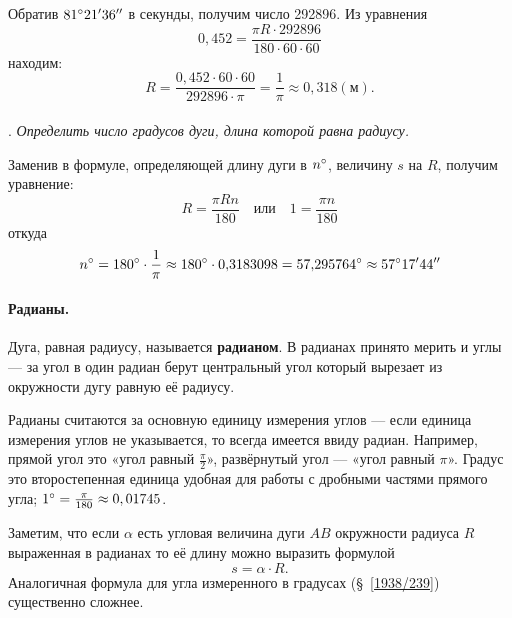 Обратив $81\degree 21'36''$ в секунды, получим число 292896.
Из уравнения
\[0{,}452 = \frac{\pi R\cdot  292896}{180\cdot 60\cdot 60}\]
находим:
\[R=\frac{0{,}452\cdot 60\cdot 60}{292896\cdot \pi}=\frac1\pi\approx0{,}318 (\text{м}).\]

\paragraph{}\label{1938/241}
.
\emph{Определить число градусов дуги, длина которой равна радиусу.}

Заменив в формуле, определяющей длину дуги в $n\degree$, величину $s$ на $R$, получим уравнение:
\[R=\frac{\pi R n}{180}
\quad\text{или}\quad
1=\frac{\pi n}{180}\]
откуда
\[n\degree = 180\degree \cdot \frac1\pi \approx 180\degree \cdot 0{,}3183098 = 57{,}295764\degree \approx 57\degree17'44''\]

\paragraph{Радианы.}\label{extra/radians}
Дуга, равная радиусу, называется \textbf{радианом}.
В радианах принято мерить и углы — за угол в один радиан берут центральный угол который вырезает из окружности дугу равную её радиусу.

Радианы считаются за основную единицу измерения углов — если единица измерения углов не указывается, то всегда имеется ввиду радиан.
Например, прямой угол это «угол равный $\tfrac\pi2$», развёрнутый угол — «угол равный $\pi$».
Градус это второстепенная единица удобная для работы с дробными частями прямого угла;
$1\degree =\tfrac\pi{180}\approx 0{,01745}$.

Заметим, что если $\alpha$ есть угловая величина дуги $AB$ окружности радиуса $R$ выраженная в радианах то её длину можно выразить формулой
\[s=\alpha\cdot R.\]
Аналогичная формула для угла измеренного в градусах (§~\ref{1938/239}) существенно сложнее.


